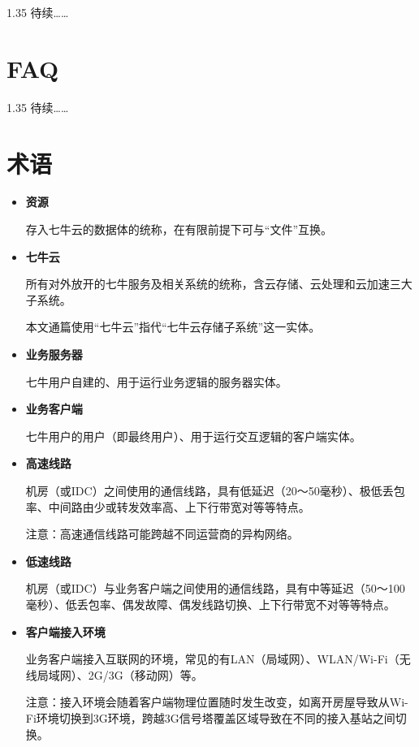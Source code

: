 \documentclass[11pt, oneside]{book}
\newcommand{\qhint}[1]{
\footnotesize
\vspace{0.2em}
\noindent
#1\par
\vspace{-0.5em}
\normalsize
}
\newcommand{\qpara}[1]{
\vspace{0.2em}
\begin{spacing}{1.35}
\noindent
#1\par
\end{spacing}
\vspace{0.2em}
}
\begin{document}
\qpara{待续……}

\chapter{FAQ}

\qpara{待续……}

\chapter{术语}

\begin{itemize}
\item {\bf 资源}\par
\qhint{存入七牛云的数据体的统称，在有限前提下可与“文件”互换。}

\item {\bf 七牛云}\par
\qhint{所有对外放开的七牛服务及相关系统的统称，含云存储、云处理和云加速三大子系统。}
\qhint{本文通篇使用“七牛云”指代“七牛云存储子系统”这一实体。}

\item {\bf 业务服务器}\par
\qhint{七牛用户自建的、用于运行业务逻辑的服务器实体。}

\item {\bf 业务客户端}\par
\qhint{七牛用户的用户（即最终用户）、用于运行交互逻辑的客户端实体。}

\item {\bf 高速线路}\par
\qhint{机房（或IDC）之间使用的通信线路，具有低延迟（20～50毫秒）、极低丢包率、中间路由少或转发效率高、上下行带宽对等等特点。}
\qhint{注意：高速通信线路可能跨越不同运营商的异构网络。}

\item {\bf 低速线路}\par
\qhint{机房（或IDC）与业务客户端之间使用的通信线路，具有中等延迟（50～100毫秒）、低丢包率、偶发故障、偶发线路切换、上下行带宽不对等等特点。}

\item {\bf 客户端接入环境}\par
\qhint{业务客户端接入互联网的环境，常见的有LAN（局域网）、WLAN/Wi-Fi（无线局域网）、2G/3G（移动网）等。}
\qhint{注意：接入环境会随着客户端物理位置随时发生改变，如离开房屋导致从Wi-Fi环境切换到3G环境，跨越3G信号塔覆盖区域导致在不同的接入基站之间切换。}
\end{itemize}
\end{document}
